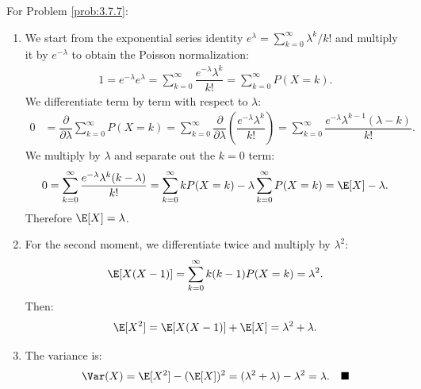 \begin{solucion}
	\label{sol:3.7.7}
	For Problem \ref{prob:3.7.7}:
	\begin{enumerate}
		\item We start from the exponential series identity $e^{\lambda} = \sum_{k=0}^{\infty} \lambda^{k}/k!$ and multiply it by $e^{-\lambda}$ to obtain the Poisson normalization:
		\begin{align*}
			1 = e^{-\lambda} e^{\lambda} = \sum_{k=0}^{\infty} \dfrac{e^{-\lambda} \lambda^{k}}{k!} = \sum_{k=0}^{\infty} P(X = k).
		\end{align*}
		We differentiate term by term with respect to $\lambda$:
		\begin{align*}
			0 &= \dfrac{\partial}{\partial \lambda} \sum_{k=0}^{\infty} P(X = k) = \sum_{k=0}^{\infty} \dfrac{\partial}{\partial \lambda}\left(\dfrac{e^{-\lambda} \lambda^{k}}{k!}\right) = \sum_{k=0}^{\infty} \dfrac{e^{-\lambda} \lambda^{k-1}(\lambda - k)}{k!}.
		\end{align*}
		We multiply by $\lambda$ and separate out the $k = 0$ term:
		\begin{align*}
			0 = \sum_{k=0}^{\infty} \dfrac{e^{-\lambda} \lambda^{k}(k - \lambda)}{k!} = \sum_{k=0}^{\infty} k P(X = k) - \lambda \sum_{k=0}^{\infty} P(X = k) = \E[X] - \lambda.
		\end{align*}
		Therefore $\E[X] = \lambda$.
		\item For the second moment, we differentiate twice and multiply by $\lambda^{2}$:
		\begin{align*}
			\E[X(X-1)] = \sum_{k=0}^{\infty} k(k-1) P(X = k) = \lambda^{2}.
		\end{align*}
		Then:
		\begin{align*}
			\E[X^{2}] = \E[X(X-1)] + \E[X] = \lambda^{2} + \lambda.
		\end{align*}
		\item The variance is:
		\begin{align*}
			\Var(X) = \E[X^{2}] - (\E[X])^{2} = (\lambda^{2} + \lambda) - \lambda^{2} = \lambda. \quad \blacksquare
		\end{align*}
	\end{enumerate}
\end{solucion}

